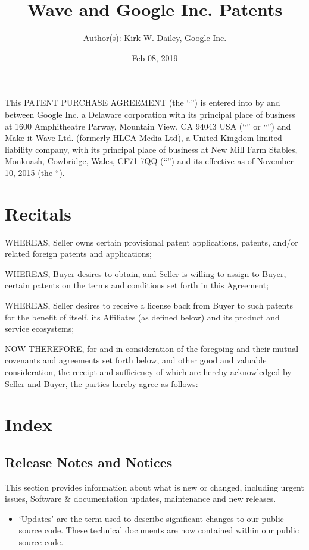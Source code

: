 \documentclass[letterpaper,10pt,openany,oneside,english]{sphinxmanual}
\title{Wave and Google Inc. Patents}
\date{Feb 08, 2019}
\author{Author(s): Kirk W. Dailey, Google Inc.}
\begin{document}
\maketitle
\sphinxtableofcontents
{}\label{\detokenize{index::doc}}


This PATENT PURCHASE AGREEMENT (the “”) is entered into by and between Google Inc. a Delaware corporation with its principal place of business at 1600 Amphitheatre Parway, Mountain View, CA 94043 USA (“” or “”) and Make it Wave Ltd. (formerly HLCA Media Ltd), a United Kingdom limited liability company, with its principal place of business at New Mill Farm Stables, Monknash, Cowbridge, Wales, CF71 7QQ (“”) and its effective as of November 10, 2015 (the “).


\chapter{Recitals}
\label{\detokenize{index:recitals}}
WHEREAS, Seller owns certain provisional patent applications, patents, and/or related foreign patents and applications;

WHEREAS, Buyer desires to obtain, and Seller is willing to assign to Buyer, certain patents on the terms and conditions set forth in this Agreement;

WHEREAS, Seller desires to receive a license back from Buyer to such patents for the benefit of itself, its Affiliates (as defined below) and its product and service ecosystems;

NOW THEREFORE, for and in consideration of the foregoing and their mutual covenants and agreements set forth below, and other good and valuable consideration, the receipt and sufficiency of which are hereby acknowledged by Seller and Buyer, the parties hereby agree as follows:


\chapter{Index}
\label{\detokenize{index:index}}

\section{Release Notes and Notices}
\label{\detokenize{releasenotes:release-notes-and-notices}}\label{\detokenize{releasenotes::doc}}
This section provides information about what is new or changed, including urgent issues, Software \& documentation updates, maintenance and new releases.
\begin{itemize}
\item {} 
‘Updates’ are the term used to describe significant changes to our public source code. These technical documents are now contained within our public source code.

\end{itemize}
\end{document}

